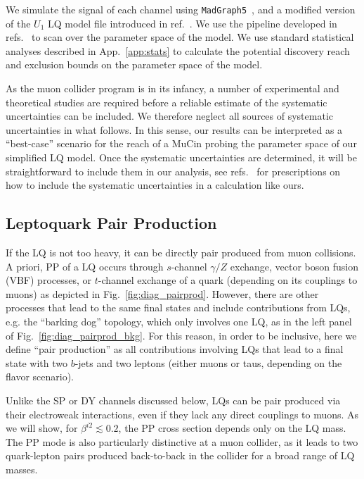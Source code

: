 \documentclass[a4paper,11pt]{article}
\newcommand{\muc}{MuC}
\begin{document}
We simulate the signal of each channel using \texttt{MadGraph5}~\cite{Alwall:2011uj}, and a modified version of the $U_1$ LQ model file introduced in ref.~\cite{Baker:2019sli}. 
We use the pipeline developed in refs.~\cite{Asadi:2017qon, Perelstein:2009} to scan over the parameter space of the model.
We use standard statistical analyses described in App.~\ref{app:stats} to calculate the potential discovery reach and exclusion bounds on the parameter space of the model.

As the muon collider program is in its infancy, a number of experimental and theoretical studies are required before a reliable estimate of the systematic uncertainties can be included. We therefore neglect all sources of systematic uncertainties in what follows.
In this sense, our results can be interpreted as a ``best-case'' scenario for the reach of a \muc in probing the parameter space of our simplified LQ model.
Once the systematic uncertainties are determined, it will be straightforward to include them in our analysis, see refs.~\cite{Cowan:1998ji,Cowan:2010js} for prescriptions on how to include the systematic uncertainties in a calculation like ours.



\subsection{Leptoquark Pair Production}
\label{subsec:PP}




If the LQ is not too heavy, it can be directly pair produced from muon collisions. A priori, PP of a LQ occurs through $s$-channel $\gamma/Z$ exchange, vector boson fusion (VBF) processes, or $t$-channel exchange of a quark (depending on its couplings to muons) as depicted in Fig.~\ref{fig:diag_pairprod}.
However, there are other processes that lead to the same final states and include contributions from LQs, e.g. the ``barking dog'' topology, which only involves one LQ, as in the left panel of Fig.~\ref{fig:diag_pairprod_bkg}. For this reason, in order to be inclusive, here we define ``pair production'' as all contributions involving LQs that lead to a final state with two $b$-jets and two leptons (either muons or taus, depending on the flavor scenario). 
 

Unlike the SP or DY channels discussed below, LQs can be pair produced via their electroweak interactions, even if they lack any direct couplings to muons.
As we will show, for $\beta^{i2} \lesssim 0.2$,
the PP cross section depends only on the LQ mass.
The PP mode is also particularly distinctive at a muon collider, as it leads to two quark-lepton pairs produced back-to-back in the collider for a broad range of LQ masses.
\end{document}
